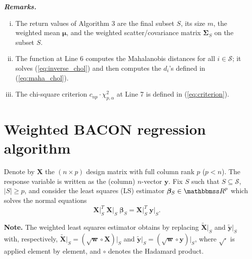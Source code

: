 \documentclass[a4paper,oneside,11pt,DIV=12]{scrartcl}
\newcommand{\R}{{\mathbbmss R}} %
\begin{document}
\vspace{1em}
\noindent\textbf{\sffamily \small \itshape Remarks.}
\vspace{-0.5em}
\begin{enumerate}[i)]
	\item The return values of Algorithm 3 are the final subset $S$, its size $m$, the weighted mean $\bm \mu$, and the weighted scatter/covariance matrix $\bm \Sigma_S$ on the subset $S$. 
	\item The function  at Line 6 computes the Mahalanobis distances for all $i \in \mathscr{S}$; it solves (\ref{eq:inverse_chol}) and then computes the $d_i$'s defined in  (\ref{eq:maha_chol}).
	\item The chi-square criterion $c_{np}\cdot \chi_{p,\alpha}^2$ at Line 7 is defined in (\ref{eq:criterion}).
\end{enumerate}	


\section{Weighted BACON regression algorithm}
Denote by $\bm X$ the $(n \times p)$ design matrix with full column rank $p$ ($p < n$). The response variable is written as the (column) $n$-vector $\bm y$. Fix $S$ such that $S \subseteq \mathscr{S}$, $\vert S \vert \geq p$, and consider the least squares (LS) estimator $\bm \beta_S \in \R^p$ which solves the normal equations 
\begin{equation}\label{eq:leastsquares}
	\bm X \vert_{S}^T \; \bm X \vert_{S} \; \bm \beta_S =  \bm X \vert_S^T \;\bm y \vert_{S}. 
\end{equation}

\textbf{\sffamily Note.} The weighted least squares estimator obtains by replacing $\widetilde{\bm X} \vert_S$ and $\widetilde{\bm y} \vert_S$ with, respectively, $\widetilde{\bm X}\vert_S = (\sqrt{\bm w} \circ \bm X)\vert_S$ and $\widetilde{\bm y}\vert_S = (\sqrt{\bm w} \circ \bm y)\vert_S$, where $\sqrt{\cdot}$ is applied element by element, and $\circ$ denotes the Hadamard product.  
\end{document}
